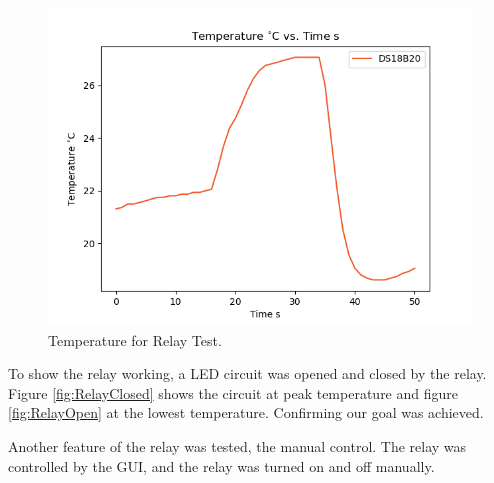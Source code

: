 \documentclass[12pt]{article}
\begin{document}
        \begin{figure}[H] 
            \centering
            \includegraphics*[scale = 0.5]{images/RelayAutoTest.png}
            \caption{Temperature  for Relay Test.}
            \label{fig:RelayAuto}
        \end{figure}

        To show the relay working, a LED circuit was opened and closed by the relay. Figure \ref{fig:RelayClosed} shows the circuit at peak temperature and figure \ref{fig:RelayOpen} at the lowest temperature. Confirming our goal was achieved.         

        Another feature of the relay was tested, the manual control. The relay was controlled by the GUI, and the relay was turned on and off manually. 
\end{document}

